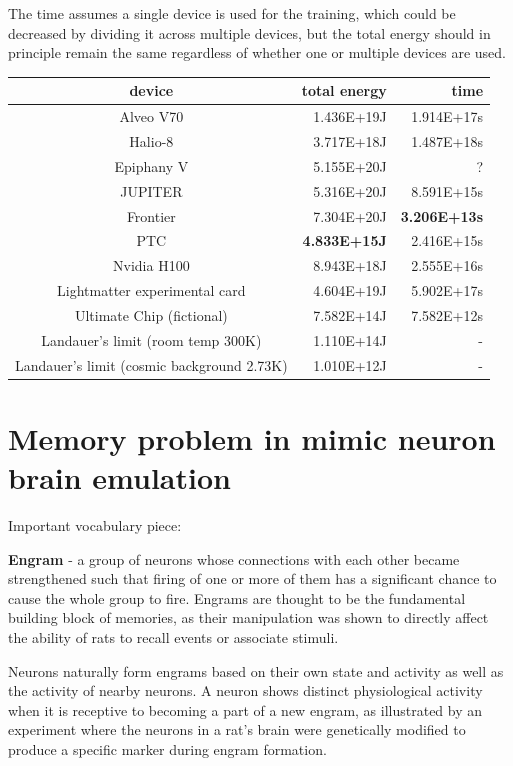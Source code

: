 \documentclass[a4paper]{article}
\begin{document}
	\medskip
	
	The time assumes a single device is used for the training, which could be decreased by dividing it across multiple devices, but the total energy should in principle remain the same regardless of whether one or multiple devices are used.
	
	\begin{center}
		\begin{tabular}{c | r | r}
			device & total energy & time \\ \hline
			Alveo V70 & 1.436E+19J & 1.914E+17s \\ \hline%
			Halio-8 & 3.717E+18J & 1.487E+18s \\ \hline%
			Epiphany V & 5.155E+20J & ? \\ \hline%
			JUPITER & 5.316E+20J & 8.591E+15s \\ \hline%
			Frontier & 7.304E+20J & \textbf{3.206E+13s} \\ \hline%
			PTC & \textbf{4.833E+15J} & 2.416E+15s \\ \hline%
			Nvidia H100 & 8.943E+18J & 2.555E+16s \\ \hline%
			Lightmatter experimental card & 4.604E+19J & 5.902E+17s \\ \hline%
			Ultimate Chip (fictional) & 7.582E+14J & 7.582E+12s \\ \hline%
			Landauer's limit (room temp 300K) & 1.110E+14J & - \\ \hline%
			Landauer's limit (cosmic background 2.73K) & 1.010E+12J & -%
		\end{tabular}
	\end{center}
	
	\pagebreak
	
	\section{Memory problem in mimic neuron brain emulation}
	
	Important vocabulary piece:
	
	\textbf{Engram} - a group of neurons whose connections with each other became strengthened such that firing of one or more of them has a significant chance to cause the whole group to fire. Engrams are thought to be the fundamental building block of memories, as their manipulation was shown to directly affect the ability of rats to recall events or associate stimuli.
	
	\medskip
	
	Neurons naturally form engrams based on their own state and activity as well as the activity of nearby neurons. A neuron shows distinct physiological activity when it is receptive to becoming a part of a new engram, as illustrated by an experiment where the neurons in a rat's brain were genetically modified to produce a specific marker during engram formation.
	
\end{document}
